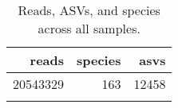 \begin{longtable}{rrr}
  \hline
reads & species & asvs \\ 
  \hline
20543329 & 163 & 12458 \\ 
   \hline
\hline
\caption{Reads, ASVs, and species across all samples.} 
\label{table:stats}
\end{longtable}
